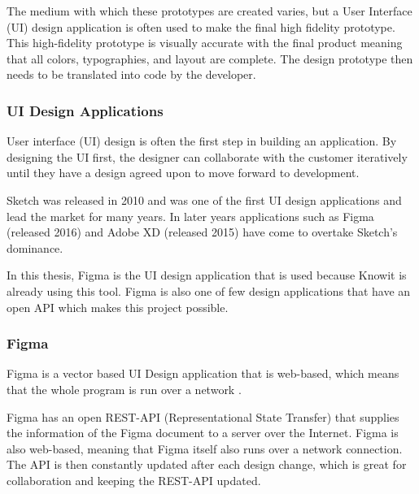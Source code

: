 The medium with which these prototypes are created varies, but a User Interface (UI) design application is often used to make the final high fidelity prototype. This high-fidelity prototype is visually accurate with the final product meaning that all colors, typographies, and layout are complete. The design prototype then needs to be translated into code by the developer. 

\subsubsection{UI Design Applications}%
\label{ssub:Apps}
User interface (UI) design is often the first step in building an application. By designing the UI first, the designer can collaborate with the customer iteratively until they have a design agreed upon to move forward to development.

Sketch\cite{sketchDigitalDesignToolkit} was released in 2010 and was one of the first UI design applications and lead the market for many years. In later years applications such as Figma\cite{figmaFigmaCollaborativeInterface}  (released 2016) and Adobe XD\cite{adobeAdobeXDFast} (released 2015) have come to overtake Sketch's dominance. 

In this thesis, Figma is the UI design application that is used because Knowit is already using this tool. Figma is also one of few design applications that have an open API which makes this project possible. 

 






\subsubsection{Figma}%
\label{sub:Figma}
Figma is a vector based UI Design application that is web-based, which means that the whole program is run over a network\cite{FigmaCollaborativeInterface} . 

Figma has an open REST-API (Representational State Transfer) that supplies the information of the Figma document to a server over the Internet\cite{figmaFigma, RepresentationalStateTransfer2021}. Figma is also web-based, meaning that Figma itself also runs over a network connection. The API is then constantly updated after each design change, which is great for collaboration and keeping the REST-API updated.


